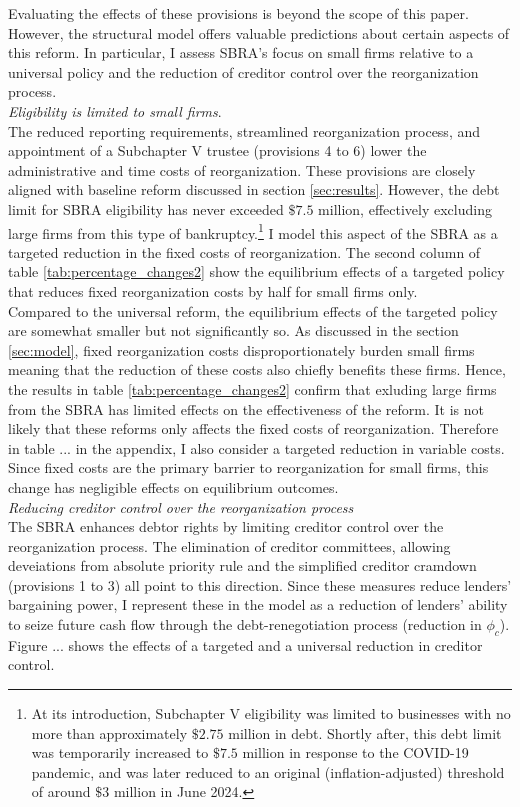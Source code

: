\documentclass[12pt]{article}
\begin{document}
\noindent Evaluating the effects of these provisions is beyond the scope of this paper. However, the structural model offers valuable predictions about certain aspects of this reform. In particular, I assess SBRA's focus on small firms relative to a universal policy and the reduction of creditor control over the reorganization process.  \vspace{3mm} \\
\textit{Eligibility is limited to small firms}. \\ 
The reduced reporting requirements, streamlined reorganization process, and appointment of a Subchapter V trustee (provisions 4 to 6) lower the administrative and time costs of reorganization. These provisions are closely aligned with baseline reform discussed in section \ref{sec:results}. However, the debt limit for SBRA eligibility has never exceeded $\$7.5$ million, effectively excluding large firms from this type of bankruptcy.\footnote{At its introduction, Subchapter V eligibility was limited to businesses with no more than approximately $\$2.75$ million in debt. Shortly after, this debt limit was temporarily increased to $\$7.5$ million in response to the COVID-19 pandemic, and was later reduced to an original (inflation-adjusted) threshold of around $\$3$ million in June 2024.} I model this aspect of the SBRA as a targeted reduction in the fixed costs of reorganization. The second column of table \ref{tab:percentage_changes2} show the equilibrium effects of a targeted policy that reduces fixed reorganization costs by half for small firms only. \vspace{3mm} \\
Compared to the universal reform, the equilibrium effects of the targeted policy are somewhat smaller but not significantly so. As discussed in the section \ref{sec:model}, fixed reorganization costs disproportionately burden small firms meaning that the reduction of these costs also chiefly benefits these firms. Hence, the results in table \ref{tab:percentage_changes2} confirm that exluding large firms from the SBRA has limited effects on the effectiveness of the reform. It is not likely that these reforms only affects the fixed costs of reorganization. Therefore in table ... in the appendix, I also consider a targeted reduction in variable costs. Since fixed costs are the primary barrier to reorganization for small firms, this change has negligible effects on equilibrium outcomes.  \vspace{3mm} \\
\textit{Reducing creditor control over the reorganization process} \\
The SBRA enhances debtor rights by limiting creditor control over the reorganization process. The elimination of creditor committees, allowing deveiations from absolute priority rule and the simplified creditor cramdown (provisions 1 to 3) all point to this direction. Since these measures reduce lenders' bargaining power, I represent these in the model as a reduction of lenders' ability to seize future cash flow through the debt-renegotiation process (reduction in $\phi_c$). Figure ... shows the effects of a targeted and a universal reduction in creditor control. 
\end{document}
